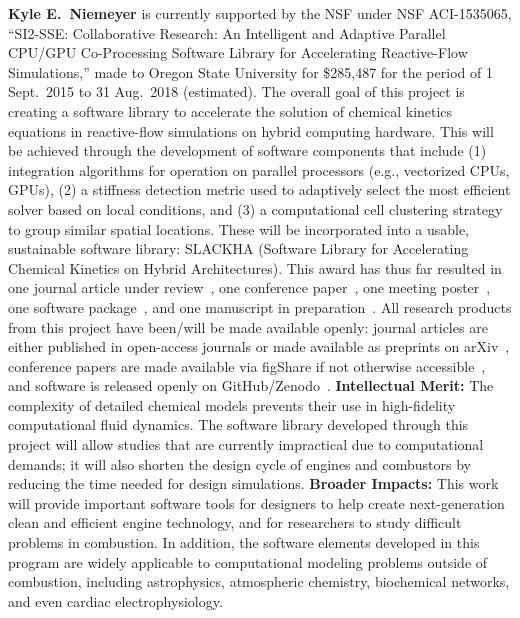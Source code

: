 \documentclass[11pt]{article}
\begin{document}
\textbf{Kyle E.~Niemeyer}
is currently supported by the NSF under NSF ACI-1535065, ``SI2-SSE: Collaborative Research: An Intelligent and Adaptive Parallel CPU\slash GPU Co-Processing Software Library for Accelerating Reactive-Flow Simulations,'' made to Oregon State University for \$285,487 for the period of 1 Sept.~2015 to 31 Aug.~2018 (estimated).
The overall goal of this project is creating a software library to accelerate the solution of chemical kinetics equations in reactive-flow simulations on hybrid computing hardware.
This will be achieved through the development of software components that include (1) integration algorithms for operation on parallel processors (e.g., vectorized CPUs, GPUs), (2) a stiffness detection metric used to adaptively select the most efficient solver based on local conditions, and (3) a computational cell clustering strategy to group similar spatial locations.
These will be incorporated into a usable, sustainable software library: SLACKHA (Software Library for Accelerating Chemical Kinetics on Hybrid Architectures).
This award has thus far resulted in one journal article under review~\cite{Niemeyer:2016}, one conference paper~\cite{Niemeyer:2015}, one meeting poster~\cite{SI2-poster:2016}, one software package~\cite{pyJac-v1.01}, and one manuscript in preparation~\cite{Curtis:2016}.
All research products from this project have been\slash will be made available openly: journal articles are either published in open-access journals or made available as preprints on arXiv~\cite{Niemeyer:2016}, conference papers are made available via figShare if not otherwise accessible~\cite{Niemeyer:2015}, and software is released openly on GitHub\slash Zenodo~\cite{pyJac-v1.01}.
\textbf{Intellectual Merit:} The complexity of detailed chemical models prevents their use in high-fidelity computational fluid dynamics. The software library developed through this project will allow studies that are currently impractical due to computational demands; it will also shorten the design cycle of engines and combustors by reducing the time needed for design simulations.
\textbf{Broader Impacts:} This work will provide important software tools for designers to help create next-generation clean and efficient engine technology, and for researchers to study difficult problems in combustion.
In addition, the software elements developed in this program are widely applicable to computational modeling problems outside of combustion, including astrophysics, atmospheric chemistry, biochemical networks, and even cardiac electrophysiology.
\end{document}
